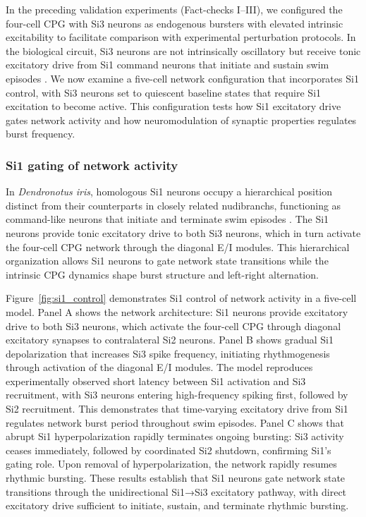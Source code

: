 \documentclass[nofootinbib,aip,amsmath,amssymb,preprint,twocolumn,floatfix,10pt]{revtex4-2}
\begin{document}
In the preceding validation experiments (Fact-checks I--III), we configured the four-cell CPG with Si3 neurons as endogenous bursters with elevated intrinsic excitability to facilitate comparison with experimental perturbation protocols. In the biological circuit, Si3 neurons are not intrinsically oscillatory but receive tonic excitatory drive from Si1 command neurons that initiate and sustain swim episodes \cite{sakurai2019command}. We now examine a five-cell network configuration that incorporates Si1 control, with Si3 neurons set to quiescent baseline states that require Si1 excitation to become active. This configuration tests how Si1 excitatory drive gates network activity and how neuromodulation of synaptic properties regulates burst frequency.

\subsubsection{Si1 gating of network activity}

In \textit{Dendronotus iris}, homologous Si1 neurons occupy a hierarchical position distinct from their counterparts in closely related nudibranchs, functioning as command-like neurons that initiate and terminate swim episodes \cite{sakurai2019command}. The Si1 neurons provide tonic excitatory drive to both Si3 neurons, which in turn activate the four-cell CPG network through the diagonal E/I modules. This hierarchical organization allows Si1 neurons to gate network state transitions while the intrinsic CPG dynamics shape burst structure and left-right alternation.


Figure~\ref{fig:si1_control} demonstrates Si1 control of network activity in a five-cell model. Panel A shows the network architecture: Si1 neurons provide excitatory drive to both Si3 neurons, which activate the four-cell CPG through diagonal excitatory synapses to contralateral Si2 neurons. Panel B shows gradual Si1 depolarization that increases Si3 spike frequency, initiating rhythmogenesis through activation of the diagonal E/I modules. The model reproduces experimentally observed short latency between Si1 activation and Si3 recruitment, with Si3 neurons entering high-frequency spiking first, followed by Si2 recruitment. This demonstrates that time-varying excitatory drive from Si1 regulates network burst period throughout swim episodes. Panel C shows that abrupt Si1 hyperpolarization rapidly terminates ongoing bursting: Si3 activity ceases immediately, followed by coordinated Si2 shutdown, confirming Si1's gating role. Upon removal of hyperpolarization, the network rapidly resumes rhythmic bursting. These results establish that Si1 neurons gate network state transitions through the unidirectional Si1→Si3 excitatory pathway, with direct excitatory drive sufficient to initiate, sustain, and terminate rhythmic bursting.
\end{document}
